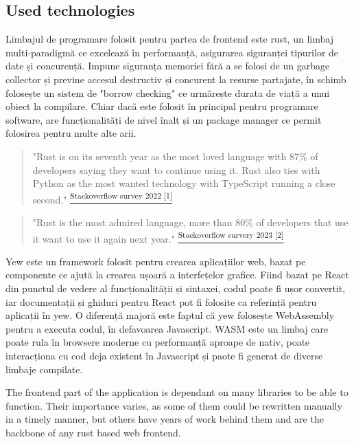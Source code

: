     \subsection{Used technologies}
    Limbajul de programare folosit pentru partea de frontend este rust, un limbaj multi-paradigmă ce excelează în performanță, asigurarea siguranței tipurilor de date și concurență. Impune siguranța memoriei fără a se folosi de un garbage collector și previne accesul destructiv și concurent la resurse partajate, în schimb folosește un sistem de "borrow checking" ce urmărește durata de viață a unui obiect la compilare. Chiar dacă este folosit în principal pentru programare software, are funcționalități de nivel înalt și un package manager ce permit folosirea pentru multe alte arii.

    \begin{quote}
        "Rust is on its seventh year as the most loved language with 87\% of developers saying they want to continue using it. Rust also ties with Python as the most wanted technology with TypeScript running a close second." \hyperref[stackoverflow-studiu-2022]{\textsuperscript{Stackoverflow survey 2022 [1]}}
    \end{quote}
    \begin{quote}
        "Rust is the most admired language, more than 80\% of developers that use it want to use it again next year." \hyperref[stackoverflow-studiu-2023]{\textsuperscript{Stackoverflow survery 2023 [2]}}
    \end{quote}

    Yew este un framework folosit pentru crearea aplicațiilor web, bazat pe componente ce ajută la crearea ușoară a interfețelor grafice. Fiind bazat pe React din punctul de vedere al funcționalității și sintaxei, codul poate fi ușor convertit, iar documentații și ghiduri pentru React pot fi folosite ca referință pentru aplicații în yew. O diferență majoră este faptul că yew folosește WebAssembly pentru a executa codul, în defavoarea Javascript. WASM este un limbaj care poate rula în browsere moderne cu performanță aproape de nativ, poate interacționa cu cod deja existent în Javascript și paote fi generat de diverse limbaje compilate.


    The frontend part of the application is dependant on many libraries to be able to function. Their importance varies, as some of them could be rewritten manually in a timely manner, but others have years of work behind them and are the backbone of any rust based web frontend.
    
